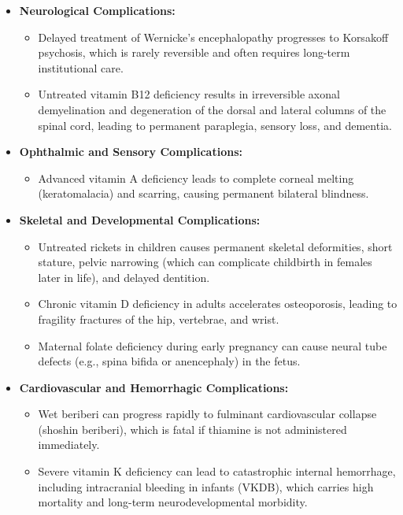 \begin{itemize}
    \item \textbf{Neurological Complications:}
    \begin{itemize}
        \item Delayed treatment of Wernicke's encephalopathy progresses to Korsakoff psychosis, which is rarely reversible and often requires long-term institutional care.
        \item Untreated vitamin B12 deficiency results in irreversible axonal demyelination and degeneration of the dorsal and lateral columns of the spinal cord, leading to permanent paraplegia, sensory loss, and dementia.
    \end{itemize}

    \item \textbf{Ophthalmic and Sensory Complications:}
    \begin{itemize}
        \item Advanced vitamin A deficiency leads to complete corneal melting (keratomalacia) and scarring, causing permanent bilateral blindness.
    \end{itemize}

    \item \textbf{Skeletal and Developmental Complications:}
    \begin{itemize}
        \item Untreated rickets in children causes permanent skeletal deformities, short stature, pelvic narrowing (which can complicate childbirth in females later in life), and delayed dentition.
        \item Chronic vitamin D deficiency in adults accelerates osteoporosis, leading to fragility fractures of the hip, vertebrae, and wrist.
        \item Maternal folate deficiency during early pregnancy can cause neural tube defects (e.g., spina bifida or anencephaly) in the fetus.
    \end{itemize}

    \item \textbf{Cardiovascular and Hemorrhagic Complications:}
    \begin{itemize}
        \item Wet beriberi can progress rapidly to fulminant cardiovascular collapse (shoshin beriberi), which is fatal if thiamine is not administered immediately.
        \item Severe vitamin K deficiency can lead to catastrophic internal hemorrhage, including intracranial bleeding in infants (VKDB), which carries high mortality and long-term neurodevelopmental morbidity.
    \end{itemize}


\end{itemize}
